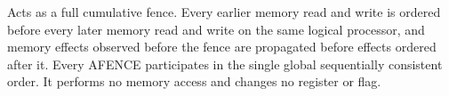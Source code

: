 Acts as a full cumulative fence. Every earlier memory read and write is ordered before every later memory read and write on the same logical processor, and memory effects observed before the fence are propagated before effects ordered after it. Every AFENCE participates in the single global sequentially consistent order. It performs no memory access and changes no register or flag.
